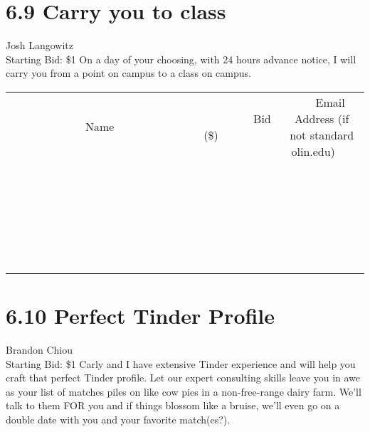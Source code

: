 \documentclass[11pt]{article}
\begin{document}
\section*{6.9 Carry you to class}
Josh Langowitz
\\
Starting Bid: \$1
\newline
On a day of your choosing, with 24 hours advance notice, I will carry you from a point on campus to a class on campus.
\\[6ex]
\begin{tabular}{c c c}
~~~~~~~~~~~~~Name~~~~~~~~~~~~~ & ~~~~~~~~~Bid (\$)~~~~~~~~~  & ~~~Email Address (if not standard olin.edu)~~~\\
 & & \\
\hline
 & & \\
\hline
 & & \\
\hline
 & & \\
\hline
 & & \\
\hline
 & & \\
\hline
 & & \\
\hline
 & & \\
\hline
 & & \\
\hline
 & & \\
\hline
 & & \\
\hline
 & & \\
\hline
 & & \\
\hline
 & & \\
\hline
 & & \\
\hline
 & & \\
\hline
 & & \\
\hline
 & & \\
\hline
 & & \\
\hline
 & & \\
\hline
 & & \\
\hline
 & & \\
\hline
 & & \\
\hline
 & & \\
\hline
 & & \\
\hline
 & & \\
\hline
\end{tabular}
\newpage
\section*{6.10 Perfect Tinder Profile}
Brandon Chiou
\\
Starting Bid: \$1
\newline
Carly and I have extensive Tinder experience and will help you craft that perfect Tinder profile. Let our expert consulting skills leave you in awe as your list of matches piles on like cow pies in a non-free-range dairy farm. We'll talk to them FOR you and if things blossom like a bruise, we'll even go on a double date with you and your favorite match(es?).
\end{document}
